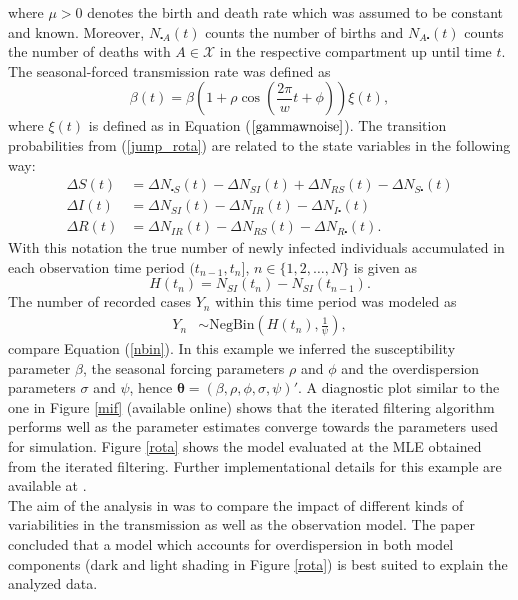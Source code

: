 where  $\mu>0$ denotes the birth and death rate which was assumed to be constant and known.  Moreover,  $N_{\centerdot A}(t)$ counts the number of births and $N_{A \centerdot}(t)$  counts the number of deaths with $A \in \mathcal{X}$ in the respective compartment up until time $t$. 
The seasonal-forced transmission rate was defined as 
\begin{equation*}
\beta(t)= \beta \left(1+\rho\cos\left(\frac{2\pi}{w} t +\phi\right)\right) \xi(t), 
\label{forcing}
\end{equation*}
where $\xi(t)$ is defined as in Equation ($\ref{gammawnoise}$).
The transition probabilities from (\ref{jump_rota}) are related to the state variables in the following way:
\begin{align}
\Delta S(t)&= \Delta N_{ \centerdot S}(t)-\Delta N_{ SI}(t) +  \Delta N_{RS}(t)-\Delta N_{S \centerdot}(t) \nonumber\\
\Delta I(t)&= \Delta N_{ SI}(t)-\Delta N_{ IR}(t)-\Delta N_{I \centerdot}(t) \nonumber\\
\Delta R(t)&= \Delta N_{IR}(t)-\Delta N_{RS}(t)-\Delta N_{R \centerdot}(t). \nonumber
\end{align} 
 With this notation 
 the true number of newly infected individuals accumulated  in each observation time period $(t_{n-1},t_{n}]$,   $ n \in \{1,2,\dots,N\}$ is given as 
\begin{equation*}
H(t_n)=N_{SI}(t_{n})-N_{SI}(t_{n-1}).\label{obs_stoc}
\end{equation*} 
\noindent The number of recorded  cases $Y_n$ within this time period was  modeled as
\begin{align*}
Y_n &\sim \text{NegBin}\left( H(t_n), \frac{1}{\psi}\right),
\end{align*}
compare Equation (\ref{nbin}).
In this example we inferred   the susceptibility parameter $\beta$, the seasonal forcing  parameters $\rho$ and $\phi$ and the overdispersion parameters $\sigma$ and $\psi$, hence $\bm{ \theta}=(\beta, \rho,\phi,\sigma, \psi)'$.  A diagnostic plot  similar to the one in Figure \ref{mif} (available online) shows that the iterated filtering algorithm performs well as the  parameter estimates converge towards the parameters used for simulation.   
Figure \ref{rota} shows the model evaluated at the MLE obtained from the iterated filtering. Further implementational details for this example are available at  \cite{theresa_git}. \\
 The aim of the analysis in \cite{Stocks2017} was to compare the impact of different kinds of variabilities in the transmission as well as the observation model. The paper concluded that a model which accounts for overdispersion in both model components (dark and light shading in Figure \ref{rota}) is best suited to explain the analyzed data. 
